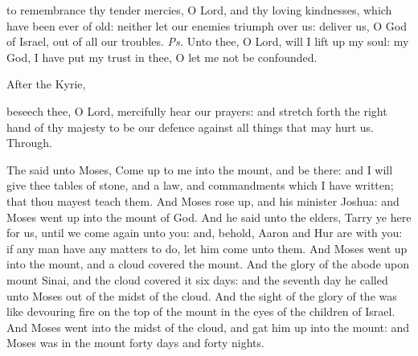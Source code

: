 

\introit
{} to remembrance thy tender mercies, O Lord, and thy loving kindnesses, which have been ever of old: neither let our enemies triumph over us: deliver us, O God of Israel, out of all our troubles. \textit{Ps.} Unto thee, O Lord, will I lift up my soul: my God, I have put my trust in thee, O let me not be confounded.

\begin{rubric}
    After the Kyrie,
\end{rubric}

\collect
{} beseech thee, O Lord, mercifully hear our prayers: and stretch forth the right hand of thy majesty to be our defence against all things that may hurt us. Through.

 The  said unto Moses, Come up to me into the mount, and be there: and I will give thee tables of stone, and a law, and commandments which I have written; that thou mayest teach them. And Moses rose up, and his minister Joshua: and Moses went up into the mount of God. And he said unto the elders, Tarry ye here for us, until we come again unto you: and, behold, Aaron and Hur are with you: if any man have any matters to do, let him come unto them. And Moses went up into the mount, and a cloud covered the mount. And the glory of the  abode upon mount Sinai, and the cloud covered it six days: and the seventh day he called unto Moses out of the midst of the cloud. And the sight of the glory of the  was like devouring fire on the top of the mount in the eyes of the children of Israel. And Moses went into the midst of the cloud, and gat him up into the mount: and Moses was in the mount forty days and forty nights.
\\

